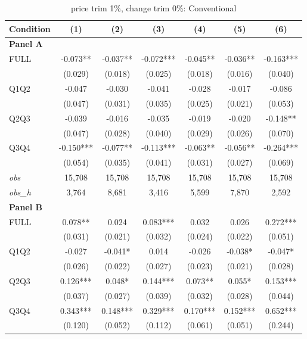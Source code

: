 \begin{table}[!htbp]
\centering
\caption{price trim 1\%, change trim 0\%: Conventional}
\label{tab:abc:trim10:conventional}
\small
\begin{tabular}{lcccccc}
\toprule
Condition & (1) & (2) & (3) & (4) & (5) & (6) \\
\midrule
\textbf{Panel A} &&&&&&  \\

FULL & -0.073** & -0.037** & -0.072*** & -0.045** & -0.036** & -0.163*** \\
 & (0.029) & (0.018) & (0.025) & (0.018) & (0.016) & (0.040) \\
Q1Q2 & -0.047 & -0.030 & -0.041 & -0.028 & -0.017 & -0.086 \\
 & (0.047) & (0.031) & (0.035) & (0.025) & (0.021) & (0.053) \\
Q2Q3 & -0.039 & -0.016 & -0.035 & -0.019 & -0.020 & -0.148** \\
 & (0.047) & (0.028) & (0.040) & (0.029) & (0.026) & (0.070) \\
Q3Q4 & -0.150*** & -0.077** & -0.113*** & -0.063** & -0.056** & -0.264*** \\
 & (0.054) & (0.035) & (0.041) & (0.031) & (0.027) & (0.069) \\

\textit{obs} & 15,708 & 15,708 & 15,708 & 15,708 & 15,708 & 15,708 \\
\textit{obs\_h} & 3,764 & 8,681 & 3,416 & 5,599 & 7,870 & 2,592 \\

\textbf{Panel B} &&&&&&  \\

FULL & 0.078** & 0.024 & 0.083*** & 0.032 & 0.026 & 0.272*** \\
 & (0.031) & (0.021) & (0.032) & (0.024) & (0.022) & (0.051) \\
Q1Q2 & -0.027 & -0.041* & 0.014 & -0.026 & -0.038* & -0.047* \\
 & (0.026) & (0.022) & (0.027) & (0.023) & (0.021) & (0.028) \\
Q2Q3 & 0.126*** & 0.048* & 0.144*** & 0.073** & 0.055* & 0.153*** \\
 & (0.037) & (0.027) & (0.039) & (0.032) & (0.028) & (0.044) \\
Q3Q4 & 0.343*** & 0.148*** & 0.329*** & 0.170*** & 0.152*** & 0.652*** \\
 & (0.120) & (0.052) & (0.112) & (0.061) & (0.051) & (0.244) \\


\end{tabular}
\end{table}
